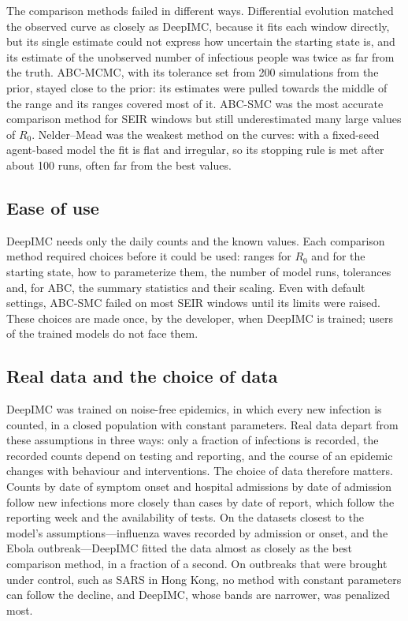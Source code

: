 \documentclass[12pt]{article}
\begin{document}
The comparison methods failed in different ways. Differential evolution matched the observed curve as closely
as DeepIMC, because it fits each window directly, but its single estimate could not express how uncertain the
starting state is, and its estimate of the unobserved number of infectious people was twice as far from the
truth. ABC-MCMC, with its tolerance set from 200 simulations from the prior, stayed close to the prior: its
estimates were pulled towards the middle of the range and its ranges covered most of it. ABC-SMC was the most
accurate comparison method for SEIR windows but still underestimated many large values of $R_0$. Nelder--Mead
was the weakest method on the curves: with a fixed-seed agent-based model the fit is flat and irregular, so its
stopping rule is met after about 100 runs, often far from the best values.

\subsection{Ease of use}

DeepIMC needs only the daily counts and the known values. Each comparison method required choices
before it could be used: ranges for $R_0$ and for the starting state, how to parameterize them, the
number of model runs, tolerances and, for ABC, the summary statistics and their scaling. Even with
default settings, ABC-SMC failed on most SEIR windows until its limits were raised. These choices
are made once, by the developer, when DeepIMC is trained; users of the trained models do not face them.

\subsection{Real data and the choice of data}

DeepIMC was trained on noise-free epidemics, in which every new infection is counted, in a closed
population with constant parameters. Real data depart from these assumptions in three ways: only a
fraction of infections is recorded, the recorded counts depend on testing and reporting, and the course
of an epidemic changes with behaviour and interventions. The choice of data therefore matters. Counts by
date of symptom onset and hospital admissions by date of admission follow new infections more closely
than cases by date of report, which follow the reporting week and the availability of tests. On the
datasets closest to the model's assumptions---influenza waves recorded by admission or onset, and the
Ebola outbreak---DeepIMC fitted the data almost as closely as the best comparison method, in a fraction of
a second. On outbreaks that were brought under control, such as SARS in Hong Kong, no method with
constant parameters can follow the decline, and DeepIMC, whose bands are narrower, was penalized most.
\end{document}
